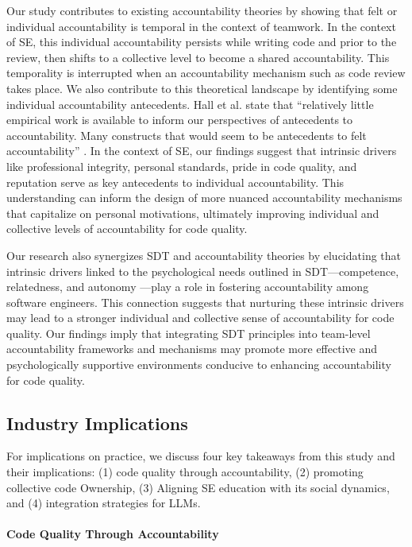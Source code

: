Our study contributes to existing accountability theories by showing that felt or individual accountability is temporal in the context of teamwork. In the context of SE, this individual accountability persists while writing code and prior to the review, then shifts to a collective level to become a shared accountability. This temporality is interrupted when an accountability mechanism such as code review takes place. We also contribute to this theoretical landscape by identifying some individual accountability antecedents. Hall et al. state that ``relatively little empirical work is available to inform our perspectives of antecedents to accountability. Many constructs that would seem to be antecedents to felt accountability'' \citep{hall2017accountability}. In the context of SE, our findings suggest that intrinsic drivers like professional integrity, personal standards, pride in code quality, and reputation serve as key antecedents to individual accountability. This understanding can inform the design of more nuanced accountability mechanisms that capitalize on personal motivations, ultimately improving individual and collective levels of accountability for code quality.

Our research also synergizes SDT and accountability theories by elucidating that intrinsic drivers linked to the psychological needs outlined in SDT---competence, relatedness, and autonomy \citep{deci2000and}---play a role in fostering accountability among software engineers. This connection suggests that nurturing these intrinsic drivers may lead to a stronger individual and collective sense of accountability for code quality. Our findings imply that integrating SDT principles into team-level accountability frameworks and mechanisms may promote more effective and psychologically supportive environments conducive to enhancing accountability for code quality.

\subsection{Industry Implications}

\noindent For implications on practice, we discuss four key takeaways from this study and their implications: (1) code quality through accountability, (2) promoting collective code Ownership, (3) Aligning SE education with its social dynamics, and (4) integration strategies for LLMs.

\paragraph*{Code Quality Through Accountability}

